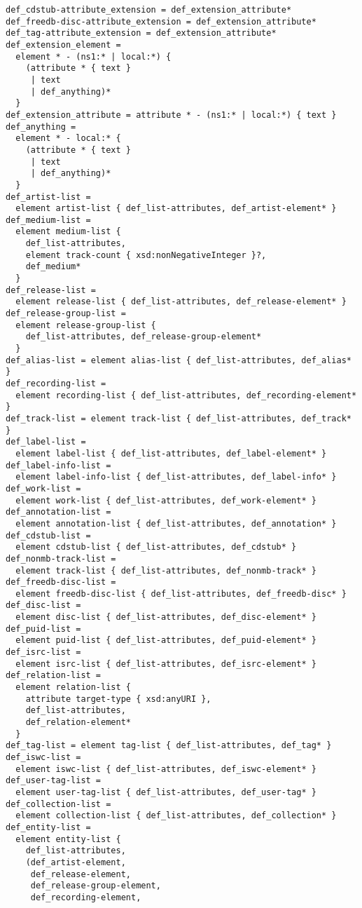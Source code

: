 \begin{Verbatim}[fontsize=\relsize{-2},frame=lines,framesep=.25in,label={[Schema Start]Schema End}]
def_cdstub-attribute_extension = def_extension_attribute*
def_freedb-disc-attribute_extension = def_extension_attribute*
def_tag-attribute_extension = def_extension_attribute*
def_extension_element =
  element * - (ns1:* | local:*) {
    (attribute * { text }
     | text
     | def_anything)*
  }
def_extension_attribute = attribute * - (ns1:* | local:*) { text }
def_anything =
  element * - local:* {
    (attribute * { text }
     | text
     | def_anything)*
  }
def_artist-list =
  element artist-list { def_list-attributes, def_artist-element* }
def_medium-list =
  element medium-list {
    def_list-attributes,
    element track-count { xsd:nonNegativeInteger }?,
    def_medium*
  }
def_release-list =
  element release-list { def_list-attributes, def_release-element* }
def_release-group-list =
  element release-group-list {
    def_list-attributes, def_release-group-element*
  }
def_alias-list = element alias-list { def_list-attributes, def_alias* }
def_recording-list =
  element recording-list { def_list-attributes, def_recording-element* }
def_track-list = element track-list { def_list-attributes, def_track* }
def_label-list =
  element label-list { def_list-attributes, def_label-element* }
def_label-info-list =
  element label-info-list { def_list-attributes, def_label-info* }
def_work-list =
  element work-list { def_list-attributes, def_work-element* }
def_annotation-list =
  element annotation-list { def_list-attributes, def_annotation* }
def_cdstub-list =
  element cdstub-list { def_list-attributes, def_cdstub* }
def_nonmb-track-list =
  element track-list { def_list-attributes, def_nonmb-track* }
def_freedb-disc-list =
  element freedb-disc-list { def_list-attributes, def_freedb-disc* }
def_disc-list =
  element disc-list { def_list-attributes, def_disc-element* }
def_puid-list =
  element puid-list { def_list-attributes, def_puid-element* }
def_isrc-list =
  element isrc-list { def_list-attributes, def_isrc-element* }
def_relation-list =
  element relation-list {
    attribute target-type { xsd:anyURI },
    def_list-attributes,
    def_relation-element*
  }
def_tag-list = element tag-list { def_list-attributes, def_tag* }
def_iswc-list =
  element iswc-list { def_list-attributes, def_iswc-element* }
def_user-tag-list =
  element user-tag-list { def_list-attributes, def_user-tag* }
def_collection-list =
  element collection-list { def_list-attributes, def_collection* }
def_entity-list =
  element entity-list {
    def_list-attributes,
    (def_artist-element,
     def_release-element,
     def_release-group-element,
     def_recording-element,

\end{Verbatim}
